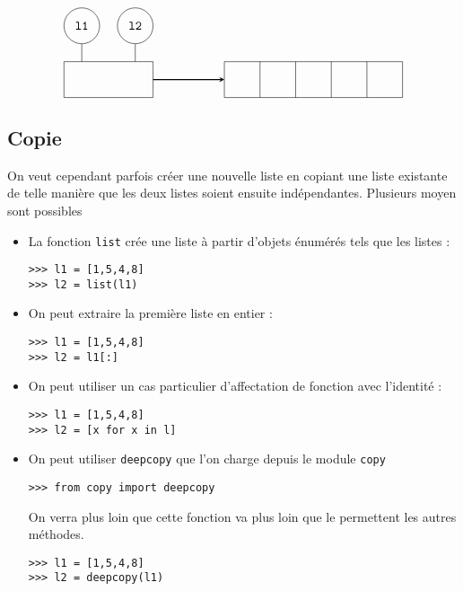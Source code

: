 $$\tikzpicture
 \tikzstyle{every node}=[circle,draw,minimum size =10mm]
 \node (l1) {\tt l1};
 \node (l2) at (1.5,0) {\tt l2};
 \draw(-0.5,-2) rectangle (2,-1);
 \draw (l1) -- (0,-1);
 \draw (l2) -- (1.5,-1);
 \draw (4,-2) grid +(5,1);
 \draw [thick,-stealth] (2,-1.5) -- (4,-1.5);
\endtikzpicture
$$


\subsection{Copie}On veut cependant parfois créer une nouvelle liste en copiant une liste existante de telle manière que les deux listes soient ensuite indépendantes. Plusieurs moyen sont possibles

\begin{itemize}

\item La fonction \lstinline?list? crée une liste  à partir d'objets énumérés tels que les listes :

\begin{lstlisting}
>>> l1 = [1,5,4,8]
>>> l2 = list(l1)
\end{lstlisting}

\item On peut extraire la première liste en entier :

\begin{lstlisting}
>>> l1 = [1,5,4,8]
>>> l2 = l1[:]
\end{lstlisting}


\item On peut utiliser un cas particulier d'affectation de fonction avec l'identité :

\begin{lstlisting}
>>> l1 = [1,5,4,8]
>>> l2 = [x for x in l]
\end{lstlisting}

\item On peut utiliser \lstinline?deepcopy? que l'on charge depuis le module \lstinline?copy?

\begin{lstlisting}
>>> from copy import deepcopy
\end{lstlisting}

On verra plus loin que cette fonction va plus loin que le permettent les autres méthodes.

\begin{lstlisting}
>>> l1 = [1,5,4,8]
>>> l2 = deepcopy(l1)
\end{lstlisting}



\end{itemize}

